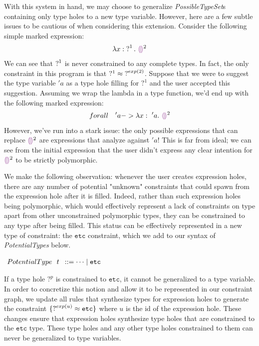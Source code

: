 With this system in hand, we may choose to generalize \emph{PossibleTypeSet}s containing only type holes to a new type variable. However, here are a few subtle issues to be cautious of when considering this extension. Consider the following simple marked expression:
$$\ECLam{x}{\TUnknown^1}{\EEHole^2}$$
We can see that $\operatorname{?}^1$ is never constrained to any complete types. In fact, the only constraint in this program is that $?^1 \approx \mathtt{?}^{exp(2)}$. Suppose that we were to suggest the type variable $'a$ as a type hole filling for $?^1$ and the user accepted this suggestion. Assuming we wrap the lambda in a type function, we'd end up with the following marked expression:
$$forall ~~~'a -> \ECLam{x}{~'a}{\EEHole^2}$$
However, we've run into a stark issue: the only possible expressions that can replace $\EEHole^2$ are expressions that analyze against $'a$! This is far from ideal; we can see from the initial expression that the user didn't express any clear intention for $\EEHole^2$ to be strictly polymorphic.

We make the following observation: whenever the user creates expression holes, there are any number of potential "unknown" constraints that could spawn from the expression hole after it is filled. Indeed, rather than such expression holes being polymorphic, which would effectively represent a lack of constraints on type apart from other unconstrained polymorphic types, they can be constrained to any type after being filled. This status can be effectively represented in a new type of constraint: the $\mathtt{etc}$ constraint, which we add to our syntax of \emph{PotentialTypes} below.
\begin{center}
$\arraycolsep=4pt\begin{array}{lll}
PotentialType~~ t & ::= 
  \dots \mid \mathtt{etc}
\end{array}$
\end{center}
If a type hole $?^p$ is constrained to $\mathtt{etc}$, it cannot be generalized to a type variable. In order to concretize this notion and allow it to be represented in our constraint graph, we update all rules that synthesize types for expression holes to generate the constraint $\{ \operatorname{?}^{exp(u)} \approx \mathtt{etc} \}$ where $u$ is the id of the expression hole. These changes ensure that expression holes synthesize type holes that are constrained to the $\mathtt{etc}$ type. These type holes and any other type holes constrained to them can never be generalized to type variables.

